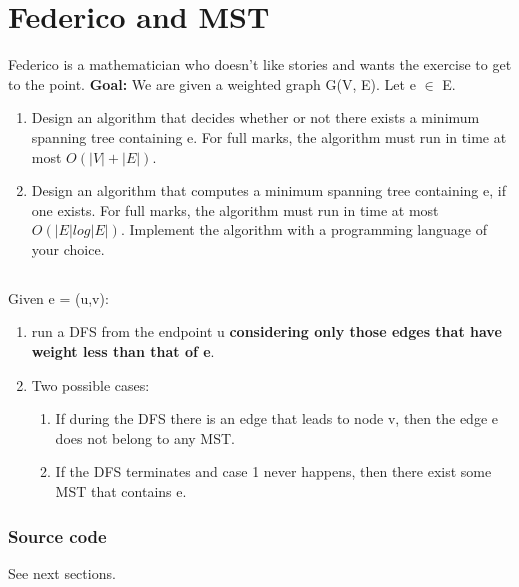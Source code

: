 \documentclass[12pt]{article}
\begin{document}
\section{}
\section{Federico and MST}
Federico is a mathematician who doesn't like stories and wants the exercise to get to the point.
\newline
\textbf{Goal:} We are given a weighted graph G(V, E). Let e $\in$ E.
\begin{enumerate}
	\item Design an algorithm that decides whether or not there exists a minimum spanning tree containing e. For full marks, the algorithm must run in time at most $O(|V | + |E|)$.
	\item Design an algorithm that computes a minimum spanning tree containing e, if one exists. For full marks, the algorithm must run in time at most $O(|E| log |E|)$. Implement the algorithm with a programming language of your choice.

\end{enumerate}
\subsection{}
Given e = (u,v):
\begin{enumerate}
	\item run a DFS from the endpoint u \textbf{considering only those edges that have weight less than that of e}.
	\item Two possible cases:
	\begin{enumerate}
		\item If during the DFS there is an edge that leads to node v, then the edge e does not belong to any MST.
		\item If the DFS terminates and case 1 never happens, then there exist some MST that contains e.
	\end{enumerate}
\end{enumerate}

\subsubsection{Source code}
See next sections.
\end{document}
